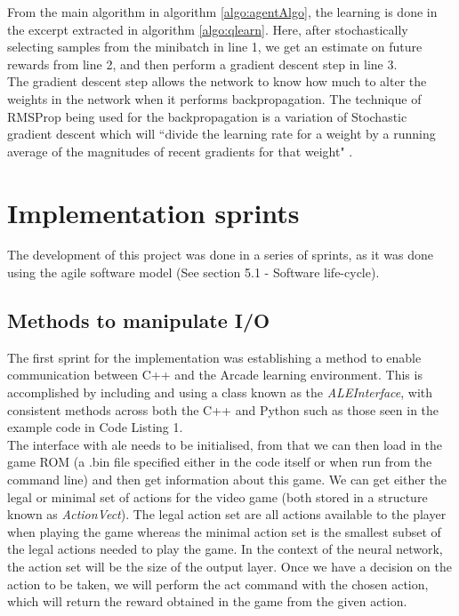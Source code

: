 \documentclass[10pt]{article}
\begin{document}
		From the main algorithm in algorithm \ref{algo:agentAlgo}, the learning is done in the excerpt extracted in algorithm \ref{algo:qlearn}. Here, after stochastically selecting samples from the minibatch in line 1, we get an estimate on future rewards from line 2, and then perform a gradient descent step in line 3.\\
		
		The gradient descent step allows the network to know how much to alter the weights in the network when it performs backpropagation. The technique of RMSProp being used for the backpropagation is a variation of Stochastic gradient descent which will ``divide the learning rate for a weight by a running average of the magnitudes of recent gradients for that weight" \cite{rms}.
	
	\bigskip

\section{Implementation sprints}
	The development of this project was done in a series of sprints, as it was done using the agile software model (See section 5.1 - Software life-cycle).
	
	\subsection{Methods to manipulate I/O}
		The first sprint for the implementation was establishing a method to enable communication between C++ and the Arcade learning environment. This is accomplished by including and using a class known as the \textit{ALEInterface}, with consistent methods across both the C++ and Python such as those seen in the example code in Code Listing 1.\\
		
		The interface with ale needs to be initialised, from that we can then load in the game ROM (a .bin file specified either in the code itself or when run from the command line) and then get information about this game. We can get either the legal or minimal set of actions for the video game (both stored in a structure known as \textit{ActionVect}). The legal action set are all actions available to the player when playing the game whereas the minimal action set is the smallest subset of the legal actions needed to play the game. In the context of the neural network, the action set will be the size of the output layer. Once we have a decision on the action to be taken, we will perform the act command with the chosen action, which will return the reward obtained in the game from the given action. 	 
		
\end{document}
